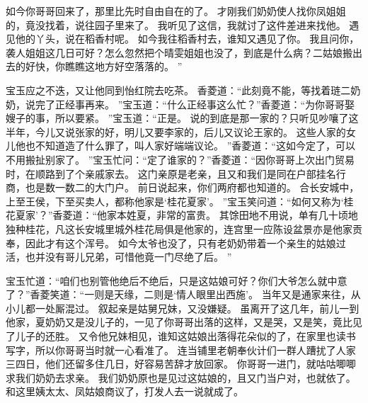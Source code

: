 如今你哥哥回来了，那里比先时自由自在的了。
才刚我们奶奶使人找你凤姐姐的，竟没找着，说往园子里来了。
我听见了这信，我就讨了这件差进来找他。
遇见他的丫头，说在稻香村呢。
如今我往稻香村去，谁知又遇见了你。
我且问你，袭人姐姐这几日可好？怎么忽然把个晴雯姐姐也没了，到底是什么病？二姑娘搬出去的好快，你瞧瞧这地方好空落落的。
”\par
宝玉应之不迭，又让他同到怡红院去吃茶。
香菱道：“此刻竟不能，等找着琏二奶奶，说完了正经事再来。
”宝玉道：“什么正经事这么忙？”香菱道：“为你哥哥娶嫂子的事，所以要紧。
”宝玉道：“正是。
说的到底是那一家的？只听见吵嚷了这半年，今儿又说张家的好，明儿又要李家的，后儿又议论王家的。
这些人家的女儿他也不知道造了什么罪了，叫人家好端端议论。
”香菱道：“这如今定了，可以不用搬扯别家了。
”宝玉忙问：“定了谁家的？”香菱道：“因你哥哥上次出门贸易时，在顺路到了个亲戚家去。
这门亲原是老亲，且又和我们是同在户部挂名行商，也是数一数二的大门户。
前日说起来，你们两府都也知道的。
合长安城中，上至王侯，下至买卖人，都称他家是‘桂花夏家’。
”宝玉笑问道：“如何又称为‘桂花夏家’？”香菱道：“他家本姓夏，非常的富贵。
其馀田地不用说，单有几十顷地独种桂花，凡这长安城里城外桂花局俱是他家的，连宫里一应陈设盆景亦是他家贡奉，因此才有这个浑号。
如今太爷也没了，只有老奶奶带着一个亲生的姑娘过活，也并没有哥儿兄弟，可惜他竟一门尽绝了后。
”\par
宝玉忙道：“咱们也别管他绝后不绝后，只是这姑娘可好？你们大爷怎么就中意了？”香菱笑道：“一则是天缘，二则是‘情人眼里出西施’。
当年又是通家来往，从小儿都一处厮混过。
叙起亲是姑舅兄妹，又没嫌疑。
虽离开了这几年，前儿一到他家，夏奶奶又是没儿子的，一见了你哥哥出落的这样，又是哭，又是笑，竟比见了儿子的还胜。
又令他兄妹相见，谁知这姑娘出落得花朵似的了，在家里也读书写字，所以你哥哥当时就一心看准了。
连当铺里老朝奉伙计们一群人蹧扰了人家三四日，他们还留多住几日，好容易苦辞才放回家。
你哥哥一进门，就咕咕唧唧求我们奶奶去求亲。
我们奶奶原也是见过这姑娘的，且又门当户对，也就依了。
和这里姨太太、凤姑娘商议了，打发人去一说就成了。
